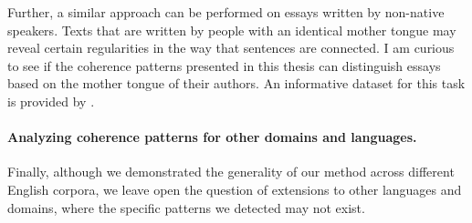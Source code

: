 Further, a similar approach can be performed on essays written by non-native speakers. 
Texts that are written by people with an identical mother tongue may reveal certain regularities in the way that sentences are connected. 
I am curious to see if the coherence patterns presented in this thesis can distinguish essays based on the mother tongue of their authors. 
An informative dataset for this task is provided by \newcite{}. 

\paragraph{Analyzing coherence patterns for other domains and languages.}
Finally, although we demonstrated the generality of our method across different English corpora, we leave open the question of extensions to other languages and domains, where the specific patterns we detected may not exist. 





